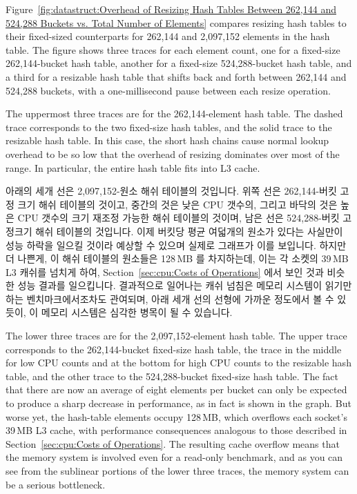 Figure~\ref{fig:datastruct:Overhead of Resizing Hash Tables Between 262,144 and 524,288 Buckets vs. Total Number of Elements}
compares resizing hash tables to their fixed-sized counterparts
for 262,144 and 2,097,152 elements in the hash table.
The figure shows three traces for each element count, one
for a fixed-size 262,144-bucket hash table, another for a
fixed-size 524,288-bucket hash table, and a third for a resizable
hash table that shifts back and forth between 262,144 and 524,288
buckets, with a one-millisecond pause between each resize operation.

The uppermost three traces are for the 262,144-element hash table.
The dashed trace corresponds to the two fixed-size hash tables,
and the solid trace to the resizable hash table.
In this case, the short hash chains cause normal lookup overhead
to be so low that the overhead of resizing dominates over most
of the range.
In particular, the entire hash table fits into L3 cache.

\fi

아래의 세개 선은 2,097,152-원소 해쉬 테이블의 것입니다.
위쪽 선은 262,144-버킷 고정 크기 해쉬 테이블의 것이고, 중간의 것은 낮은 CPU
갯수의, 그리고 바닥의 것은 높은 CPU 갯수의 크기 재조정 가능한 해쉬 테이블의
것이며, 남은 선은 524,288-버킷 고정크기 해쉬 테이블의 것입니다.
이제 버킷당 평균 여덟개의 원소가 있다는 사실만이 성능 하락을 일으킬 것이라
예상할 수 있으며 실제로 그래프가 이를 보입니다.
하지만 더 나쁜게, 이 해쉬 테이블의 원소들은 128\,MB 를 차지하는데, 이는 각
소켓의 39\,MB L3 캐쉬를 넘치게 하여, 
Section~\ref{sec:cpu:Costs of Operations} 에서 보인 것과 비슷한 성능 결과를
일으킵니다.
결과적으로 일어나는 캐쉬 넘침은 메모리 시스템이 읽기만 하는 벤치마크에서조차도
관여되며, 아래 세개 선의 선형에 가까운 정도에서 볼 수 있듯이, 이 메모리
시스템은 심각한 병목이 될 수 있습니다.

\iffalse

The lower three traces are for the 2,097,152-element hash table.
The upper trace corresponds to the 262,144-bucket fixed-size hash table,
the trace in the middle for low CPU counts and at the bottom for high
CPU counts to the resizable hash table, and the other trace
to the 524,288-bucket fixed-size hash table.
The fact that there are now an average of eight elements per bucket
can only be expected to produce a sharp decrease in performance,
as in fact is shown in the graph.
But worse yet, the hash-table elements occupy 128\,MB, which overflows
each socket's 39\,MB L3 cache, with performance consequences analogous
to those described in Section~\ref{sec:cpu:Costs of Operations}.
The resulting cache overflow means that the memory system is involved
even for a read-only benchmark, and as you can see from the sublinear
portions of the lower three traces, the memory system can be a serious
bottleneck.

